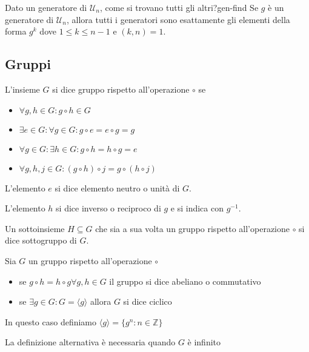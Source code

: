 \documentclass[11pt]{article}
\newcommand{\calU}{\mathcal{U}}
\begin{document}
    \begin{question}
    {Dato un generatore di $\calU_n$, come si trovano tutti gli altri?}{gen-find}
        Se $g$ è un generatore di $\calU_n$, allora tutti i generatori sono esattamente gli elementi della forma $g^k$ dove $1 \leq k \leq n-1$ e $(k,n) = 1$.
    \end{question}

\subsection{Gruppi}
    \begin{definition}{}{}
        L'insieme $G$ si dice gruppo rispetto all'operazione $\circ$ se
        \begin{itemize}
            \item $\forall g, h \in G: g \circ h \in G$
            \item $\exists e \in G : \forall g \in G :g \circ e = e \circ g = g$
            \item $\forall g \in G: \exists h \in G : g \circ h = h \circ g = e$
            \item $\forall g, h, j \in G : (g \circ h) \circ j = g \circ (h \circ j)$
        \end{itemize}

        L'elemento $e$ si dice elemento neutro o unità di $G$.

        L'elemento $h$ si dice inverso o reciproco di $g$ e si indica con $g^{-1}$.

        Un sottoinsieme $H \subseteq G$ che sia a sua volta un gruppo rispetto all'operazione $\circ$ si dice sottogruppo di $G$.
        
    \end{definition}

    \begin{definition}{}{}
        Sia $G$ un gruppo rispetto all'operazione $\circ$
        \begin{itemize}
            \item se $g \circ h = h \circ g \forall g,h \in G$ il gruppo si dice abeliano o commutativo
            \item se $\exists g \in G : G = \langle g \rangle$ allora $G$ si dice ciclico
        \end{itemize}
        In questo caso definiamo $\langle g \rangle = \{ g^n : n \in \mathbb{Z}\}$
            
        La definizione alternativa è necessaria quando $G$ è infinito
        
    \end{definition}
\end{document}
